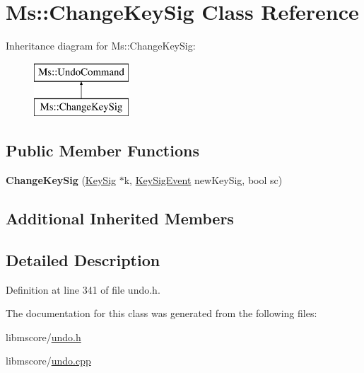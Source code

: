 \hypertarget{class_ms_1_1_change_key_sig}{}\section{Ms\+:\+:Change\+Key\+Sig Class Reference}
\label{class_ms_1_1_change_key_sig}
Inheritance diagram for Ms\+:\+:Change\+Key\+Sig\+:\begin{figure}[H]
\begin{center}
\leavevmode
\includegraphics[height=2.000000cm]{class_ms_1_1_change_key_sig}
\end{center}
\end{figure}
\subsection*{Public Member Functions}
\begin{DoxyCompactItemize}
\item 
\mbox{\label{class_ms_1_1_change_key_sig_ae162ad7870c5ce77205d35735c8f009c}} 
{\bfseries Change\+Key\+Sig} (\hyperlink{class_ms_1_1_key_sig}{Key\+Sig} $\ast$k, \hyperlink{class_ms_1_1_key_sig_event}{Key\+Sig\+Event} new\+Key\+Sig, bool sc)
\end{DoxyCompactItemize}
\subsection*{Additional Inherited Members}


\subsection{Detailed Description}


Definition at line 341 of file undo.\+h.



The documentation for this class was generated from the following files\+:\begin{DoxyCompactItemize}
\item 
libmscore/\hyperlink{undo_8h}{undo.\+h}\item 
libmscore/\hyperlink{undo_8cpp}{undo.\+cpp}\end{DoxyCompactItemize}
